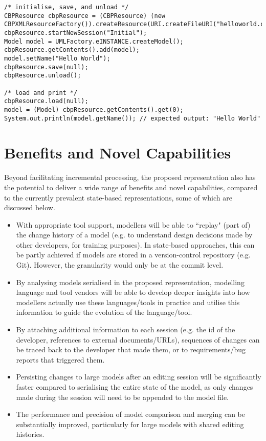\vspace{-20pt}
\begin{lstlisting}[style=java,caption={An example how to use \textsf{CBPResource} in Java code.},label=lst:javacode_resource]
/* initialise, save, and unload */
CBPResource cbpResource = (CBPResource) (new CBPXMLResourceFactory()).createResource(URI.createFileURI("helloworld.cbpxml"));
cbpResource.startNewSession("Initial");
Model model = UMLFactory.eINSTANCE.createModel();
cbpResource.getContents().add(model);
model.setName("Hello World");
cbpResource.save(null);
cbpResource.unload();

/* load and print */
cbpResource.load(null);
model = (Model) cbpResource.getContents().get(0);
System.out.println(model.getName()); // expected output: "Hello World"
\end{lstlisting}

\section{Benefits and Novel Capabilities}
\label{sec:benefits_and_novel_capabilities}
Beyond facilitating incremental processing, the proposed representation 
also has the potential to deliver a wide range of benefits and 
novel capabilities, compared to the currently prevalent 
state-based representations, some of which are discussed below.

\begin{itemize}
    \item With appropriate tool support, modellers will be able to ``replay" (part of) the change history of a model (e.g. to understand design decisions made by other developers, for training purposes). In state-based approaches, this can be partly achieved if models are stored in a version-control repository (e.g. Git). However, the granularity would only be at the commit level.
    \item By analysing models serialised in the proposed representation, modelling language and tool vendors will be able to develop deeper insights into how modellers actually use these languages/tools in practice and utilise this information to guide the evolution of the language/tool.
    \item By attaching additional information to each session (e.g. the id of the developer, references to external documents/URLs), sequences of changes can be traced back to the developer that made them, or to requirements/bug reports that triggered them.
    \item Persisting changes to large models after an editing session will be significantly faster compared to serialising the entire state of the model, as only changes made during the session will need to be appended to the model file.
    \item The performance and precision of model comparison and merging can be substantially improved, particularly for large models with shared editing histories.
\end{itemize}

